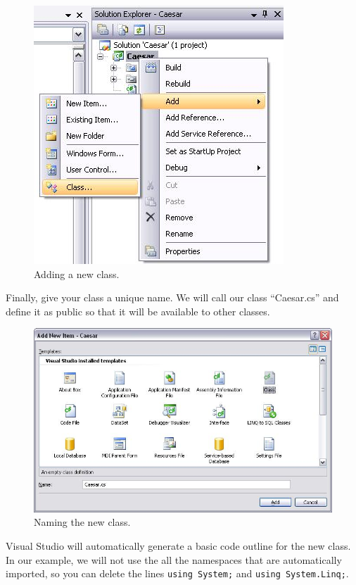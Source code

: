 \begin{figure}[h]
	\centering
		\includegraphics{figures/add_new_class.jpg}
	\caption{Adding a new class.}
	\label{fig:add_new_class}
\end{figure}
\clearpage

\noindent Finally, give your class a unique name. We will call our class ``Caesar.cs'' and define it as public so that it will be available to other classes.

\begin{figure}[h!]
	\centering
		\includegraphics[width=1.00\textwidth]{figures/name_new_class.jpg}
	\caption{Naming the new class.}
	\label{fig:name_new_class}
\end{figure}

\noindent Visual Studio will automatically generate a basic code outline for the new class. In our example, we will not use the all the namespaces that are automatically imported, so you can delete the lines \texttt{using System;} and \texttt{using System.Linq;}.

